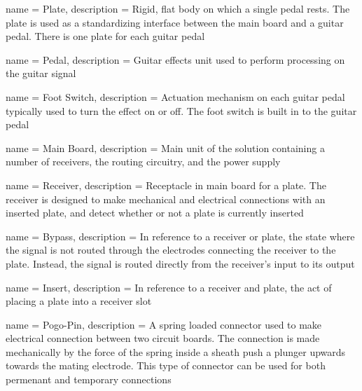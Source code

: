  {
	name = Plate,
	description = {Rigid, flat body on which a single pedal rests.  The plate is used as a standardizing interface between the main board and a guitar pedal.  There is one plate for each guitar pedal}
}

 {
	name = Pedal,
	description = {Guitar effects unit used to perform processing on the guitar signal}
}

 {
	name = {Foot Switch},
	description = {Actuation mechanism on each guitar pedal typically used to turn the effect on or off.  The foot switch is built in to the guitar pedal}
}

 {
	name = {Main Board},
	description = {Main unit of the solution containing a number of receivers, the routing circuitry, and the power supply}
}

 {
	name = {Receiver},
	description = {Receptacle in main board for a plate.  The receiver is designed to make mechanical and electrical connections with an inserted plate, and detect whether or not a plate is currently inserted}
}

 {
	name = {Bypass},
	description = {In reference to a receiver or plate, the state where the signal is not routed through the electrodes connecting the receiver to the plate.  Instead, the signal is routed directly from the receiver's input to its output}
}

 {
	name = {Insert},
	description = {In reference to a receiver and plate, the act of placing a plate into a receiver slot}
}

 {
	name = {Pogo-Pin}, 
	description = {A spring loaded connector used to make electrical connection between two circuit boards.  The connection is made mechanically by the force of the spring inside a sheath push a plunger upwards towards the mating electrode.  This type of connector can be used for both permenant and temporary connections}
}